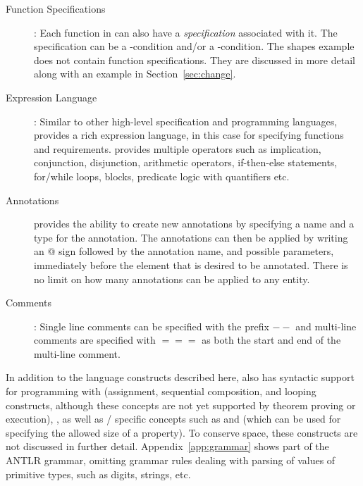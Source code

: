 \begin{description}
\item [Function Specifications]: Each function in \Klang{} can also
  have a \emph{specification} associated with it. The specification
  can be a -condition and/or a
  -condition. The shapes example does not contain function
  specifications. They are discussed in more detail along with
  an example in Section~\ref{sec:change}.
  
\item [Expression Language]: Similar to other high-level 
  specification and programming 
  languages, \Klang{} provides a rich
  expression language, in this case for specifying functions and
  requirements. \Klang{} provides multiple operators such as
  implication, conjunction, disjunction, arithmetic operators,
  if-then-else statements, for/while loops, blocks, predicate logic
  with quantifiers etc. 

\item [Annotations] \Klang{} provides the ability to create new
  annotations by specifying a name and a type for the annotation. The
  annotations can then be applied by writing an $@$ sign followed by
  the annotation name, and possible parameters, immediately before the 
  element that is desired to be annotated. There is no limit on how many 
  annotations can be applied to any entity. 

\item [Comments]: Single line comments can be specified with the
  prefix $--$ and multi-line comments are specified with $===$ as both
  the start and end of the multi-line comment.

\end{description}

In addition to the language constructs described here, \Klang{} also
has syntactic support for programming with  (assignment,
sequential composition, and looping constructs, although these concepts are not yet supported by theorem proving or execution), , as well as \sysml{}/\uml{} specific concepts such as
 and  (which can be used for
specifying the allowed size of a property).  To conserve space, these
constructs are not discussed in further detail.
Appendix~\ref{app:grammar} shows part of the \Klang{} ANTLR grammar,
omitting grammar rules dealing with parsing of values of primitive
types, such as digits, strings, etc.

